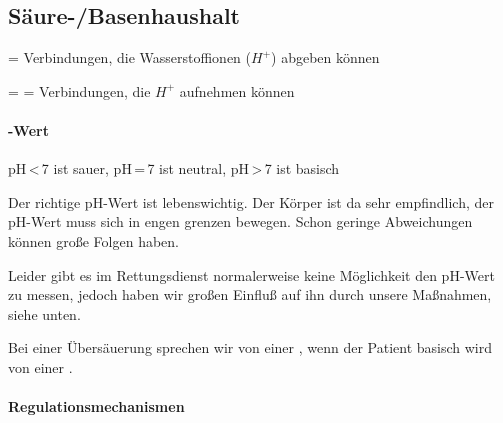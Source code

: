 \subsection{S\"aure-/Basenhaushalt}


 = Verbindungen, die 
Wasserstoffionen ($H^+$) abgeben k\"onnen

 =  =
Verbindungen, die $H^+$ aufnehmen k\"onnen

\paragraph{-Wert}


pH\,{\textless}\,7 ist sauer, pH\,=\,7 ist neutral,
pH\,{\textgreater}\,7 ist basisch


Der richtige pH-Wert ist lebenswichtig. Der K\"orper ist da sehr
empfindlich, der pH-Wert muss sich in engen grenzen bewegen. Schon
geringe Abweichungen k\"onnen gro{\ss}e Folgen haben. 

Leider gibt es im Rettungsdienst normalerweise keine M\"oglichkeit den
pH-Wert zu messen, jedoch haben wir gro{\ss}en Einflu{\ss} auf ihn
durch unsere Ma{\ss}nahmen, siehe unten. 

Bei einer \"Ubers\"auerung sprechen wir von einer
, wenn der Patient basisch wird
von einer .


\paragraph{Regulationsmechanismen}

